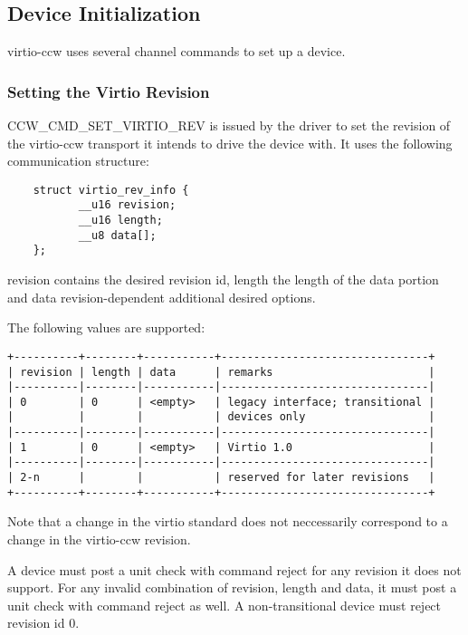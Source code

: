 \subsection{Device Initialization}\label{sec:Virtio Transport Options / Virtio over channel I/O / Device Initialization}

virtio-ccw uses several channel commands to set up a device.

\subsubsection{Setting the Virtio Revision}\label{sec:Virtio Transport Options / Virtio over channel I/O / Device Initialization / Setting the Virtio Revision}

CCW_CMD_SET_VIRTIO_REV is issued by the driver to set the revision of
the virtio-ccw transport it intends to drive the device with. It uses the
following communication structure:

\begin{lstlisting}
	struct virtio_rev_info {
	       __u16 revision;
	       __u16 length;
	       __u8 data[];
	};
\end{lstlisting}

revision contains the desired revision id, length the length of the
data portion and data revision-dependent additional desired options.

The following values are supported:

\begin{verbatim}
+----------+--------+-----------+--------------------------------+
| revision | length | data      | remarks                        |
|----------|--------|-----------|--------------------------------|
| 0        | 0      | <empty>   | legacy interface; transitional |
|          |        |           | devices only                   |
|----------|--------|-----------|--------------------------------|
| 1        | 0      | <empty>   | Virtio 1.0                     |
|----------|--------|-----------|--------------------------------|
| 2-n      |        |           | reserved for later revisions   |
+----------+--------+-----------+--------------------------------+
\end{verbatim}

Note that a change in the virtio standard does not neccessarily
correspond to a change in the virtio-ccw revision.

A device must post a unit check with command reject for any revision
it does not support. For any invalid combination of revision, length
and data, it must post a unit check with command reject as well. A
non-transitional device must reject revision id 0.


